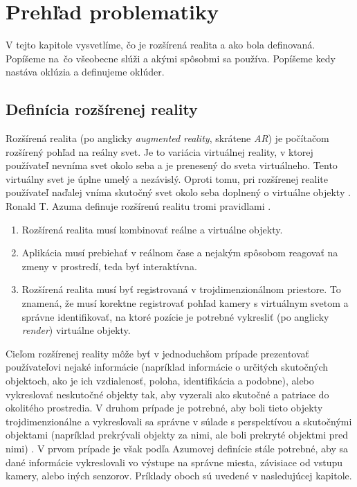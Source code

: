 \chapter{Prehľad problematiky}

V tejto kapitole vysvetlíme, čo je rozšírená realita a ako bola definovaná. Popíšeme na~čo všeobecne slúži a akými spôsobmi sa používa. Popíšeme kedy nastáva oklúzia a definujeme oklúder.

\section{Definícia rozšírenej reality}

Rozšírená realita (po anglicky \emph{augmented reality}, skrátene \emph{AR}) je počítačom rozšírený pohľad na reálny svet. Je to variácia virtuálnej reality, v ktorej používateľ nevníma svet okolo seba a je prenesený do sveta virtuálneho. Tento virtuálny svet je úplne umelý a nezávislý. Oproti tomu, pri rozšírenej realite používateľ naďalej vníma skutočný svet okolo seba doplnený o virtuálne objekty \cite{Azuma97}. Ronald T. Azuma definuje rozšírenú realitu tromi pravidlami \cite{Azuma97}.

\begin{enumerate}
\item Rozšírená realita musí kombinovať reálne a virtuálne objekty.
\item Aplikácia musí prebiehať v reálnom čase a nejakým spôsobom reagovať na zmeny v prostredí, teda byť interaktívna.
\item Rozšírená realita musí byť registrovaná v trojdimenzionálnom priestore. To znamená, že musí korektne registrovať pohľad kamery s virtuálnym svetom a správne identifikovať, na ktoré pozície je potrebné vykresliť (po anglicky \emph{render}) virtuálne objekty.
\end{enumerate}

Cieľom rozšírenej reality môže byť v jednoduchšom prípade prezentovať používateľovi nejaké informácie (napríklad informácie o určitých skutočných objektoch, ako je ich vzdialenosť, poloha, identifikácia a podobne), alebo vykreslovať neskutočné objekty tak, aby vyzerali ako skutočné a patriace do okolitého prostredia. V druhom prípade je potrebné, aby boli tieto objekty trojdimenzionálne a vykresľovali sa správne v súlade s perspektívou a skutočnými objektami (napríklad prekrývali objekty za nimi, ale boli prekryté objektmi pred nimi) \cite{Azuma01}. V prvom prípade je však podľa Azumovej definície stále potrebné, aby sa dané informácie vykreslovali vo výstupe na správne miesta, závisiace od vstupu kamery, alebo iných senzorov. Príklady oboch sú uvedené v nasledujúcej kapitole.

